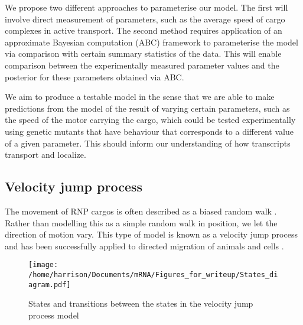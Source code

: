 \documentclass[twocolumn]{biophys}
\begin{document}
We propose two different approaches to parameterise our model. 
The first will involve direct measurement of parameters, such as the average speed of cargo complexes in active transport.
The second method requires application of an approximate Bayesian computation (ABC) framework \citep{johnston2014interpreting, turner2012tutorial, beaumont2002approximate} to parameterise the model via comparison with certain summary statistics of the data.
This will enable comparison between the experimentally measured parameter values and the posterior for these parameters obtained via ABC.

We aim to produce a testable model in the sense that we are able to make predictions from the model of the result of varying certain parameters, such as the speed of the motor carrying the cargo, which could be tested experimentally using genetic mutants that have behaviour that corresponds to a different value of a given parameter. 
This should inform our understanding of how transcripts transport and localize.

\subsection{Velocity jump process}
The movement of RNP cargos is often described as a biased random walk \citep{zimyanin2008vivo}. Rather than modelling this as a simple random walk in position, we let the direction of motion vary. 
This type of model is known as a velocity jump process and has been successfully applied to directed migration of animals and cells \citep{codling2005calculating, taylorking2015birds}.

\begin{figure}[h]
 \centering
 \texttt{[image: /home/harrison/Documents/mRNA/Figures\_for\_writeup/States\_diagram.pdf]}
 \caption{States and transitions between the states in the velocity jump process model}
 \label{FIG:Phases_of_motion}
\end{figure}
\end{document}
